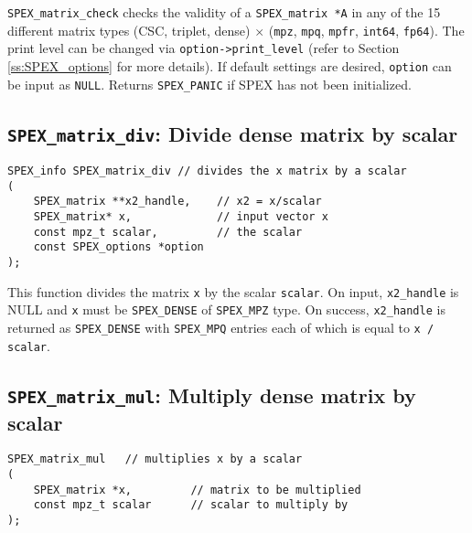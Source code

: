 \documentclass[12pt]{report}
\theoremstyle{definition}
\begin{document}
\verb|SPEX_matrix_check| checks the validity of a \verb|SPEX_matrix *A| in any
of the 15 different matrix types (CSC, triplet, dense) $\times$ (\verb|mpz|,
\verb|mpq|, \verb|mpfr|, \verb|int64|, \verb|fp64|). The print level can be
changed via \verb|option->print_level| (refer to Section \ref{ss:SPEX_options}
for more details).  If default settings are desired, \verb|option| can be input
as \verb|NULL|.  Returns \verb|SPEX_PANIC| if SPEX has not been initialized.


\newpage
\cprotect\subsection{\verb|SPEX_matrix_div|: Divide dense matrix by scalar}

\begin{mdframed}[userdefinedwidth=6in]
{\footnotesize
\begin{verbatim}
SPEX_info SPEX_matrix_div // divides the x matrix by a scalar
(
    SPEX_matrix **x2_handle,    // x2 = x/scalar
    SPEX_matrix* x,             // input vector x
    const mpz_t scalar,         // the scalar
    const SPEX_options *option
);
\end{verbatim}
} \end{mdframed}

This function divides the matrix \verb|x| by the scalar \verb|scalar|. On input, \verb|x2_handle| is NULL and \verb|x| must be \verb|SPEX_DENSE| of \verb|SPEX_MPZ| type. On success, \verb|x2_handle| is returned as \verb|SPEX_DENSE| with \verb|SPEX_MPQ| entries each of which is equal to \verb|x / scalar|.

\cprotect\subsection{\verb|SPEX_matrix_mul|: Multiply dense matrix by scalar}

\begin{mdframed}[userdefinedwidth=6in]
{\footnotesize
\begin{verbatim}
SPEX_matrix_mul   // multiplies x by a scalar
(
    SPEX_matrix *x,         // matrix to be multiplied
    const mpz_t scalar      // scalar to multiply by
);
\end{verbatim}
} \end{mdframed}
\end{document}
